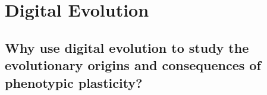 \section{Digital Evolution}

\subsection{Why use digital evolution to study the evolutionary origins and consequences of phenotypic plasticity?}
